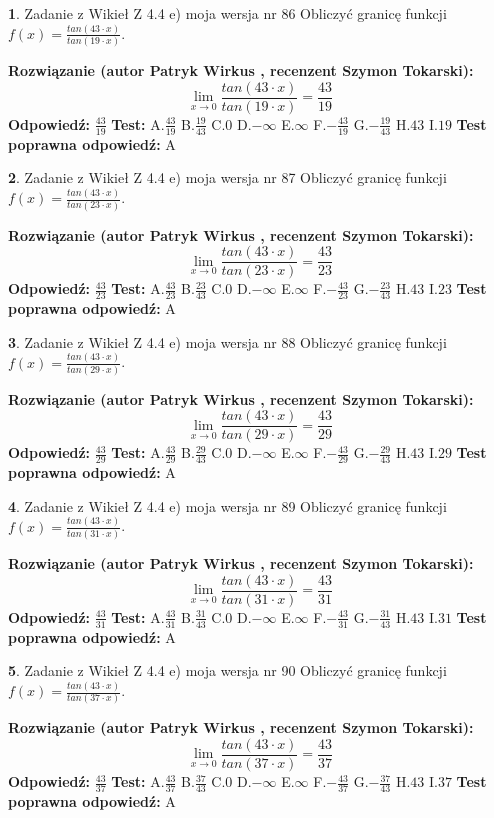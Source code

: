 \documentclass[12pt, a4paper]{article}
\theoremstyle{definition} %
\newtheorem{zad}{}
\newcommand{\zadStart}[1]{\begin{zad}#1\newline}
\newcommand{\zadStop}{\end{zad}}
\newcommand{\rozwStart}[2]{\noindent \textbf{Rozwiązanie (autor #1 , recenzent #2): }\newline}
\newcommand{\rozwStop}{\newline}
\newcommand{\odpStart}{\noindent \textbf{Odpowiedź:}\newline}
\newcommand{\odpStop}{\newline}
\newcommand{\testStart}{\noindent \textbf{Test:}\newline}
\newcommand{\testStop}{\newline}
\newcommand{\kluczStart}{\noindent \textbf{Test poprawna odpowiedź:}\newline}
\newcommand{\kluczStop}{\newline}
\begin{document}
\zadStart{Zadanie z Wikieł Z 4.4 e) moja wersja nr 86}
Obliczyć granicę funkcji $f(x)=\frac{tan(43\cdot x)}{tan(19\cdot x)}$.
\zadStop
\rozwStart{Patryk Wirkus}{Szymon Tokarski}
$$\lim\limits_{x\to 0}\frac{tan(43\cdot x)}{tan(19\cdot x)}=
\frac{43}{19}$$
\rozwStop
\odpStart
$\frac{43}{19}$
\odpStop
\testStart
A.$\frac{43}{19}$
B.$\frac{19}{43}$
C.$0$
D.$-\infty$
E.$\infty$
F.$-\frac{43}{19}$
G.$-\frac{19}{43}$
H.$43$
I.$19$
\testStop
\kluczStart
A
\kluczStop



\zadStart{Zadanie z Wikieł Z 4.4 e) moja wersja nr 87}
Obliczyć granicę funkcji $f(x)=\frac{tan(43\cdot x)}{tan(23\cdot x)}$.
\zadStop
\rozwStart{Patryk Wirkus}{Szymon Tokarski}
$$\lim\limits_{x\to 0}\frac{tan(43\cdot x)}{tan(23\cdot x)}=
\frac{43}{23}$$
\rozwStop
\odpStart
$\frac{43}{23}$
\odpStop
\testStart
A.$\frac{43}{23}$
B.$\frac{23}{43}$
C.$0$
D.$-\infty$
E.$\infty$
F.$-\frac{43}{23}$
G.$-\frac{23}{43}$
H.$43$
I.$23$
\testStop
\kluczStart
A
\kluczStop



\zadStart{Zadanie z Wikieł Z 4.4 e) moja wersja nr 88}
Obliczyć granicę funkcji $f(x)=\frac{tan(43\cdot x)}{tan(29\cdot x)}$.
\zadStop
\rozwStart{Patryk Wirkus}{Szymon Tokarski}
$$\lim\limits_{x\to 0}\frac{tan(43\cdot x)}{tan(29\cdot x)}=
\frac{43}{29}$$
\rozwStop
\odpStart
$\frac{43}{29}$
\odpStop
\testStart
A.$\frac{43}{29}$
B.$\frac{29}{43}$
C.$0$
D.$-\infty$
E.$\infty$
F.$-\frac{43}{29}$
G.$-\frac{29}{43}$
H.$43$
I.$29$
\testStop
\kluczStart
A
\kluczStop



\zadStart{Zadanie z Wikieł Z 4.4 e) moja wersja nr 89}
Obliczyć granicę funkcji $f(x)=\frac{tan(43\cdot x)}{tan(31\cdot x)}$.
\zadStop
\rozwStart{Patryk Wirkus}{Szymon Tokarski}
$$\lim\limits_{x\to 0}\frac{tan(43\cdot x)}{tan(31\cdot x)}=
\frac{43}{31}$$
\rozwStop
\odpStart
$\frac{43}{31}$
\odpStop
\testStart
A.$\frac{43}{31}$
B.$\frac{31}{43}$
C.$0$
D.$-\infty$
E.$\infty$
F.$-\frac{43}{31}$
G.$-\frac{31}{43}$
H.$43$
I.$31$
\testStop
\kluczStart
A
\kluczStop



\zadStart{Zadanie z Wikieł Z 4.4 e) moja wersja nr 90}
Obliczyć granicę funkcji $f(x)=\frac{tan(43\cdot x)}{tan(37\cdot x)}$.
\zadStop
\rozwStart{Patryk Wirkus}{Szymon Tokarski}
$$\lim\limits_{x\to 0}\frac{tan(43\cdot x)}{tan(37\cdot x)}=
\frac{43}{37}$$
\rozwStop
\odpStart
$\frac{43}{37}$
\odpStop
\testStart
A.$\frac{43}{37}$
B.$\frac{37}{43}$
C.$0$
D.$-\infty$
E.$\infty$
F.$-\frac{43}{37}$
G.$-\frac{37}{43}$
H.$43$
I.$37$
\testStop
\kluczStart
A
\kluczStop
\end{document}
